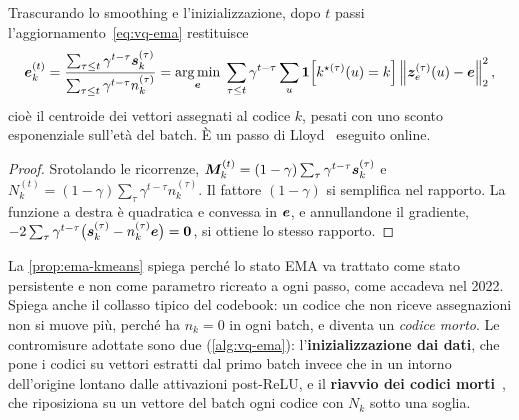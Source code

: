 \begin{proposizione}
\label{prop:ema-kmeans}
Trascurando lo smoothing e l'inizializzazione, dopo $t$ passi l'aggiornamento~\eqref{eq:vq-ema}
restituisce
\[
  \bm{e}_k^{(t)}=\frac{\sum_{\tau\le t}\gamma^{t-\tau}\bm{s}_k^{(\tau)}}
                        {\sum_{\tau\le t}\gamma^{t-\tau}n_k^{(\tau)}}
  =\operatorname*{arg\,min}_{\bm{e}}\;\sum_{\tau\le t}\gamma^{t-\tau}\sum_{u}\mathbf{1}\!\left[k^{\star(\tau)}(u)=k\right]
   \left\lVert \bm{z}_e^{(\tau)}(u)-\bm{e} \right\rVert_2^2 ,
\]
cioè il centroide dei vettori assegnati al codice $k$, pesati con uno sconto esponenziale
sull'età del batch. È un passo di Lloyd~\cite{lloyd1982kmeans} eseguito online.
\end{proposizione}
\begin{proof}
Srotolando le ricorrenze, $\bm{M}_k^{(t)}=(1-\gamma)\sum_{\tau}\gamma^{t-\tau}\bm{s}_k^{(\tau)}$ e
$N_k^{(t)}=(1-\gamma)\sum_\tau\gamma^{t-\tau}n_k^{(\tau)}$. Il fattore $(1-\gamma)$ si semplifica
nel rapporto. La funzione a destra è quadratica e convessa in $\bm{e}$, e annullandone il
gradiente,
$-2\sum_\tau\gamma^{t-\tau}\bigl(\bm{s}_k^{(\tau)}-n_k^{(\tau)}\bm{e}\bigr)=\bm{0}$, si
ottiene lo stesso rapporto.
\end{proof}

La \cref{prop:ema-kmeans} spiega perché lo stato EMA va trattato come stato persistente e non
come parametro ricreato a ogni passo, come accadeva nel 2022. Spiega anche il collasso tipico del
codebook: un codice che non riceve assegnazioni non si muove più, perché ha $n_k=0$ in ogni
batch, e diventa un \emph{codice morto}. Le contromisure adottate sono due
(\cref{alg:vq-ema}): l'\textbf{inizializzazione dai dati}, che pone i codici su vettori estratti
dal primo batch invece che in un intorno dell'origine lontano dalle attivazioni post-ReLU, e il
\textbf{riavvio dei codici morti}~\cite{lancucki2020robust}, che riposiziona su un vettore del
batch ogni codice con $N_k$ sotto una soglia.

